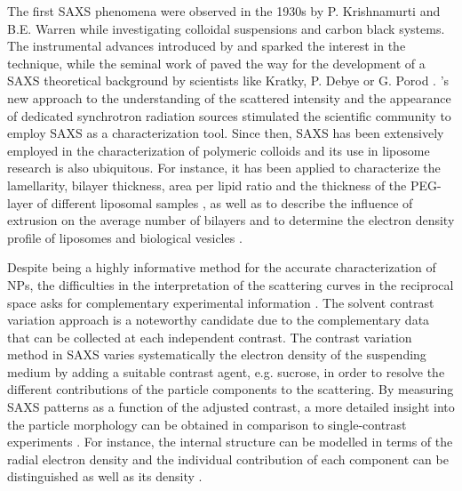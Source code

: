 The first SAXS phenomena were observed in the 1930s by P. Krishnamurti and B.E. Warren \citep{krishnamurti_studies_1930,krishnamurti_studies_1930-1, warren_xray_1934} while investigating colloidal suspensions and carbon black systems. The instrumental advances introduced by \cite{kratky_berechnung_1938} and \cite{guinier_dispositif_1937} sparked the interest in the technique, while the seminal work of \cite{guinier_diffraction_1939} paved the way for the development of a SAXS theoretical background by scientists like Kratky, P. Debye or G. Porod \citep{kratky_bestimmung_1943,debye_scattering_1949,kratky_diffuse_1949,guinier_study_1950,guinier_small-angle_1955}. \cite{stuhrmann_elimination_1965}'s new approach to the understanding of the scattered intensity \citep{stuhrmann_elimination_1965} and the appearance of dedicated synchrotron radiation sources stimulated the scientific community to employ SAXS as a characterization tool. Since then, SAXS has been extensively employed in the characterization of polymeric colloids \citep{dingenouts_analysis_1999,chu_small-angle_2001,ballauff_analysis_2011} and its use in liposome research is also ubiquitous. For instance, it has been applied to characterize the lamellarity, bilayer thickness, area per lipid ratio \citep{pabst_applications_2010,bouwstra_small_1993,brzustowicz_x-ray_2005} and the thickness of the PEG-layer of different liposomal samples \citep{varga_closer_2010,varga_characterization_2012}, as well as to describe the influence of extrusion on the average number of bilayers \citep{jousma_characterization_1987} and to determine the electron density profile of liposomes \citep{bouwstra_small_1993,brzustowicz_x-ray_2005,hirai_determination_2003} and biological vesicles \citep{castorph_structure_2010}.

Despite being a highly informative method for the accurate characterization of NPs, the difficulties in the interpretation of the scattering curves in the reciprocal space asks for complementary experimental information \citep{mykhaylyk_structural_2012}. The solvent contrast variation approach is a noteworthy candidate due to the complementary data that can be collected at each independent contrast. The contrast variation method in SAXS varies systematically the electron density of the suspending medium by adding a suitable contrast agent, e.g. sucrose, in order to resolve the different contributions of the particle components to the scattering. By measuring SAXS patterns as a function of the adjusted contrast, a more detailed insight into the particle morphology can be obtained in comparison to single-contrast experiments \citep{bolze_situ_2004}. For instance, the internal structure can be modelled in terms of the radial electron density \citep{dingenouts_radial_1994,dingenouts_analysis_1999,ballauff_analysis_2011,ballauff_small-angle_1996} and the individual contribution of each component can be distinguished \citep{beyer_saxs_1990,grunder_analysis_1991,grunder_small-angle_1993,ottewill_characterization_1995,bolze_small-angle_1997,dingenouts_structure_1994} as well as its density \citep{mykhaylyk_application_2007}.

